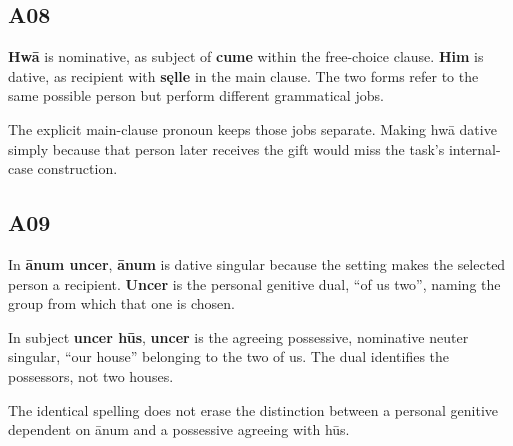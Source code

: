 \subsection*{A08}

\par\begin{minipage}{\linewidth}\raggedright
\textbf{Hwā} is nominative, as subject of \textbf{cume} within the free-choice clause. \textbf{Him} is dative, as recipient with \textbf{sęlle} in the main clause. The two forms refer to the same possible person but perform different grammatical jobs.

The explicit main-clause pronoun keeps those jobs separate. Making hwā dative simply because that person later receives the gift would miss the task’s internal-case construction.

\end{minipage}\par\addvspace{4pt}

\subsection*{A09}

\par\begin{minipage}{\linewidth}\raggedright
In \textbf{ānum uncer}, \textbf{ānum} is dative singular because the setting makes the selected person a recipient. \textbf{Uncer} is the personal genitive dual, “of us two”, naming the group from which that one is chosen.

In subject \textbf{uncer hūs}, \textbf{uncer} is the agreeing possessive, nominative neuter singular, “our house” belonging to the two of us. The dual identifies the possessors, not two houses.

The identical spelling does not erase the distinction between a personal genitive dependent on ānum and a possessive agreeing with hūs.

\end{minipage}\par\addvspace{4pt}

